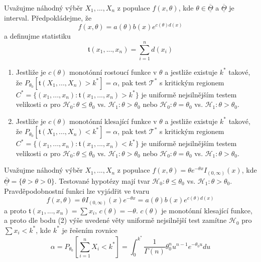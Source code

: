 \begin{theorem}
Uvažujme náhodný výběr $X_1, ..., X_n$ z populace $f(x, \theta)$, kde $\theta \in \overline{\underline{\Theta}}$ a $\overline{\underline{\Theta}}$ je interval. Předpokládejme, že
\begin{equation*}
f(x, \theta) = a(\theta)b(x)e^{c(\theta)d(x)}
\end{equation*}
a definujme statistiku
\begin{equation*}
\mathfrak{t}(x_1, ..., x_n) = \sum_{i = 1}^n d(x_i)
\end{equation*}
\begin{enumerate}
\item Jestliže je $c(\theta)$ monotónní rostoucí funkce v $\theta$ a jestliže existuje $k^*$ takové, že $P_{\theta_0}[\mathfrak{t}(X_1, ..., X_n) > k^*] = \alpha$, pak test $\mathscr{T}^*$ s kritickým regionem $C^* = \{(x_1, ..., x_n): \mathfrak{t}(x_1, ..., x_n) > k^*\}$ je uniformě nejsilnějším testem velikosti $\alpha$ pro $\mathscr{H}_0: \theta \le \theta_0$ vs. $\mathscr{H}_1: \theta > \theta_0$ nebo $\mathscr{H}_0: \theta = \theta_0$ vs. $\mathscr{H}_1: \theta > \theta_0$.
\item Jestliže je $c(\theta)$ monotónní klesající funkce v $\theta$ a jestliže existuje $k^*$ takové, že $P_{\theta_0}[\mathfrak{t}(X_1, ..., X_n) < k^*] = \alpha$, pak test $\mathscr{T}^*$ s kritickým regionem $C^* = \{(x_1, ..., x_n): \mathfrak{t}(x_1, ..., x_n) < k^*\}$ je uniformě nejsilnějším testem velikosti $\alpha$ pro $\mathscr{H}_0: \theta \le \theta_0$ vs. $\mathscr{H}_1: \theta > \theta_0$ nebo $\mathscr{H}_0: \theta = \theta_0$ vs. $\mathscr{H}_1: \theta > \theta_0$.
\end{enumerate}
\end{theorem}

\begin{example}
Uvažujme náhodný výběr $X_1, ..., X_n$ z populace $f(x, \theta) = \theta e^{-\theta x}I_{(0, \infty)}(x)$, kde $\overline{\underline{\Theta}} = \{\theta> \theta > 0\}$. Testované hypotézy mají tvar $\mathscr{H}_0: \theta \le \theta_0$ vs. $\mathscr{H}_1: \theta > \theta_0$. Pravděpodobnostní funkci lze vyjádřit ve tvaru
\begin{equation*}
f(x, \theta) = \theta I_{(0, \infty)}(x)e^{-\theta x} = a(\theta)b(x)e^{c(\theta)d(x)}
\end{equation*}
a proto $\mathfrak{t}(x_1, ..., x_n) = \sum x_i$, $c(\theta) = -\theta$. $c(\theta)$ je monotónní klesající funkce, a proto dle bodu (2) výše uvedené věty uniformě nejsilnější test zamítne $\mathscr{H}_0$ pro $\sum x_i < k^*$, kde $k^*$ je řešením rovnice
\begin{equation*}
\alpha = P_{\theta_0}\left[\sum_{i = 1}^n X_i < k^* \right] = \int_0^{k^*}\frac{1}{\Gamma(n)}\theta_0^n u^{n - 1}e^{-\theta_0 u}du
\end{equation*} 
\end{example}

